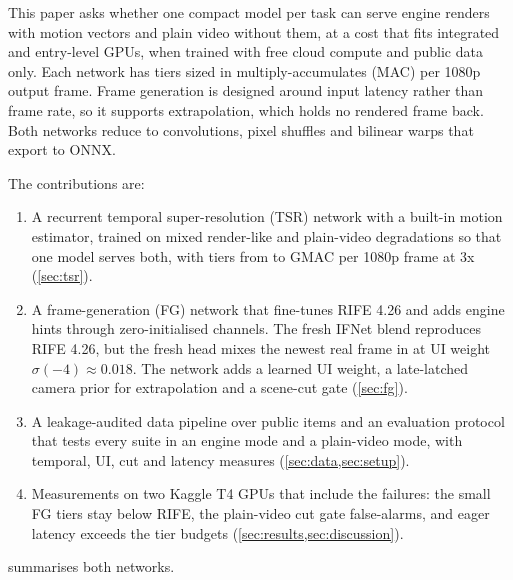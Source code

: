 \documentclass[pdflatex,sn-mathphys-num,iicol]{sn-jnl}
\begin{document}
This paper asks whether one compact model per task can serve engine renders with motion vectors and plain video without them, at a cost that fits integrated and entry-level GPUs, when trained with free cloud compute and public data only. Each network has tiers sized in multiply-accumulates (MAC) per 1080p output frame. Frame generation is designed around input latency rather than frame rate, so it supports extrapolation, which holds no rendered frame back. Both networks reduce to convolutions, pixel shuffles and bilinear warps that export to ONNX.

The contributions are:
\begin{enumerate}
\item A recurrent temporal super-resolution (TSR) network with a built-in motion estimator, trained on mixed render-like and plain-video degradations so that one model serves both, with tiers from  to  GMAC per 1080p frame at 3x (\cref{sec:tsr}).
\item A frame-generation (FG) network that fine-tunes RIFE 4.26 and adds engine hints through zero-initialised channels. The fresh IFNet blend reproduces RIFE 4.26, but the fresh head mixes the newest real frame in at UI weight $\sigma(-4)\approx0.018$. The network adds a learned UI weight, a late-latched camera prior for extrapolation and a scene-cut gate (\cref{sec:fg}).
\item A leakage-audited data pipeline over  public items and an evaluation protocol that tests every suite in an engine mode and a plain-video mode, with temporal, UI, cut and latency measures (\cref{sec:data,sec:setup}).
\item Measurements on two Kaggle T4 GPUs that include the failures: the small FG tiers stay below RIFE, the plain-video cut gate false-alarms, and eager latency exceeds the tier budgets (\cref{sec:results,sec:discussion}).
\end{enumerate}
 summarises both networks.
\end{document}

